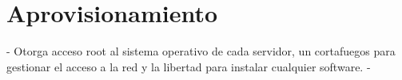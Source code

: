 \chapter{Aprovisionamiento}
\label{capaprovisionamiento}

- Otorga acceso root al sistema operativo de cada servidor, un cortafuegos para gestionar el acceso a la red y la libertad para instalar cualquier software.
- 